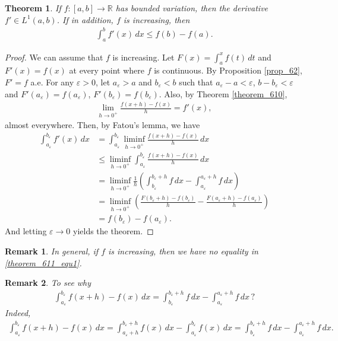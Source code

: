 \documentclass[11pt]{book}
\newtheorem{theorem}{Theorem}[chapter]
\newtheorem{remark}{Remark}[chapter]
\theoremstyle{definition}
\numberwithin{equation}{chapter}
\begin{document}
\begin{theorem}
If $f: [a,b] \to \mathbb{R}$ has bounded variation, then the derivative $f' \in L^1(a,b)$. If in addition, $f$ is increasing, then
\begin{align}\label{theorem_611_equ1}
    \int^b_a f'(x)\,dx \leq f(b) - f(a).
\end{align}
\end{theorem}
\begin{proof}
We can assume that $f$ is increasing. Let $F(x) = \int^x_a f(t) \,dt$ and $F'(x) = f(x)$ at every point where $f$ is continuous. By Proposition \ref{prop_62}, $F' = f$ a.e. For any $\varepsilon > 0$, let $a_\varepsilon > a$ and $b_\varepsilon < b$ such that 
$a_\varepsilon - a < \varepsilon$, $b - b_\varepsilon < \varepsilon$ and $F'(a_\varepsilon) = f(a_\varepsilon)$, $F'(b_\varepsilon) = f(b_\varepsilon)$. Also, by Theorem \ref{theorem_610}, 
\begin{align*}
    \lim_{h \to 0^+} \frac{f(x+h) - f(x)}{h} = f'(x),
\end{align*}
almost everywhere. Then, by Fatou's lemma, we have
\begin{align*}
    \int^{b_\varepsilon}_{a_\varepsilon} f'(x)\,dx & = \int^{b_\varepsilon}_{a_\varepsilon} \liminf_{h\to 0^+} \frac{f(x+h) - f(x)}{h}\,dx \\
    & \leq \liminf_{h\to 0^+} \int^{b_\varepsilon}_{a_\varepsilon} \frac{f(x+h) - f(x)}{h}\,dx \\
    & = \liminf_{h\to 0^+} \frac{1}{h} \left(\int^{b_\varepsilon+h}_{b_\varepsilon} f \,dx - \int^{a_\varepsilon+h}_{a_\varepsilon} f \,dx\right) \\
    & = \liminf_{h\to 0^+} \left(\frac{F(b_\varepsilon+h) - f(b_\varepsilon)}{h}- \frac{F(a_\varepsilon+h) - f(a_\varepsilon)}{h}\right) \\
    & = f(b_\varepsilon) - f(a_\varepsilon).
\end{align*}And letting $\varepsilon \to 0$ yields the theorem.
\end{proof}

\medskip

\begin{remark}
In general, if $f$ is increasing, then we have no equality in \eqref{theorem_611_equ1}.
\end{remark}

\medskip

\begin{remark}
To see why 
\begin{align*}
    \int^{b_\varepsilon}_{a_\varepsilon} f(x+h) - f(x)\,dx =  \int^{b_\varepsilon+h}_{b_\varepsilon} f \,dx - \int^{a_\varepsilon+h}_{a_\varepsilon} f \,dx \,?
\end{align*}
Indeed,
\begin{align*}
    \int^{b_\varepsilon}_{a_\varepsilon} f(x+h) - f(x)\,dx = \int^{b_\varepsilon+h}_{a_\varepsilon+h} f(x) \,dx - \int^{b_\varepsilon}_{a_\varepsilon} f(x)\,dx = \int^{b_\varepsilon+h}_{b_\varepsilon} f \,dx - \int^{a_\varepsilon+h}_{a_\varepsilon} f \,dx.
\end{align*}
\end{remark}
\end{document}
